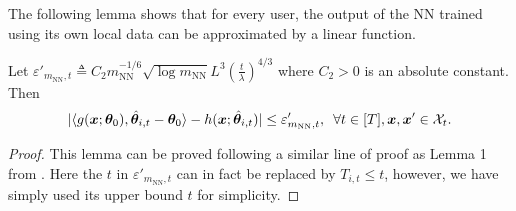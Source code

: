 The following lemma shows that for every user, the output of the NN trained using its own local data can be approximated by a linear function.
\begin{lemma}
\label{lemma:bound:approx:error:linear:nn:duel:individual}
    Let $\varepsilon'_{m_{\text{NN}},t} \triangleq C_2 m_{\text{NN}}^{-1/6}\sqrt{\log m_{\text{NN}}} L^3 \left(\frac{t}{\lambda}\right)^{4/3}$ where $C_2>0$ is an absolute constant.
    Then
    \[
   		|\langle g(\boldsymbol{x};\boldsymbol{\theta}_0), \hat{\boldsymbol{\theta}}_{i,t} - \boldsymbol{\theta}_0 \rangle - h(\boldsymbol{x};\hat{\boldsymbol{\theta}}_{i,t}) | \leq \varepsilon'_{m_{\text{NN}},t}, \,\,\, \forall t\in[T], \boldsymbol{x},\boldsymbol{x}'\in\mathcal{X}_t.
    \]
\end{lemma}
\begin{proof}
This lemma can be proved following a similar line of proof as Lemma 1 from \citet{verma2024neural}.
Here the $t$ in $\varepsilon'_{m_{\text{NN}},t}$ can in fact be replaced by $T_{i,t} \leq t$, however, we have simply used its upper bound $t$ for simplicity.
\end{proof}

